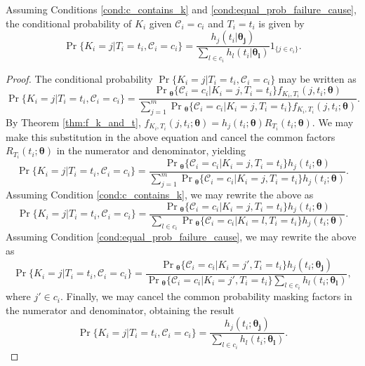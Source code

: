 \documentclass[
]{article}
\begin{document}
\begin{theorem}
Assuming Conditions \ref{cond:c_contains_k} and \ref{cond:equal_prob_failure_cause},
the conditional probability of $K_i$ given $\mathcal{C}_i = c_i$ and $T_i = t_i$
is given by
\begin{equation}
\label{eq:cond_prob_k_given_t_and_c}
\Pr\{K_i = j|T_i=t_i,\mathcal{C}_i=c_i\} =
 \frac{h_j(t_i|\boldsymbol{\theta_j})}{\sum_{l \in c_i} h_l(t_i|\boldsymbol{\theta_l})} 1_{\{j \in c_i\}}.
\end{equation}
\end{theorem}
\begin{proof}
The conditional probability $\Pr\{K_i = j|T_i=t_i,\mathcal{C}_i=c_i\}$ may be
written as
$$
\Pr\{K_i = j|T_i=t_i,\mathcal{C}_i=c_i\} =
    \frac{\Pr{}_{\!\boldsymbol{\theta}}\{\mathcal{C}_i=c_i|K_i = j,T_i=t_i\} f_{K_i,T_i}(j,t_i;\boldsymbol{\theta})}
    {\sum_{j=1}^m \Pr{}_{\!\boldsymbol{\theta}}
        \{\mathcal{C}_i=c_i|K_i = j,T_i=t_i\} f_{K_i,T_i}(j,t_i;\boldsymbol{\theta})}.
$$
By Theorem \ref{thm:f_k_and_t},
$f_{K_i,T_i}(j,t_i;\boldsymbol{\theta}) = h_j(t_i;\boldsymbol{\theta})R_{T_i}(t_i;\boldsymbol{\theta})$.
We may make this substitution in the above equation and cancel the common
factors $R_{T_i}(t_i;\boldsymbol{\theta})$ in the numerator and denominator, yielding
$$
\Pr\{K_i = j|T_i=t_i,\mathcal{C}_i=c_i\} =
    \frac{\Pr{}_{\!\boldsymbol{\theta}}\{\mathcal{C}_i=c_i|K_i = j,T_i=t_i\} h_j(t_i;\boldsymbol{\theta})}
         {\sum_{j=1}^m \Pr{}_{\!\boldsymbol{\theta}}\{\mathcal{C}_i=c_i|K_i=j,T_i=t_i\} h_j(t_i;\boldsymbol{\theta})}.
$$
Assuming Condition \ref{cond:c_contains_k}, we may rewrite the above as
$$
\Pr\{K_i = j|T_i=t_i,\mathcal{C}_i=c_i\}
    = \frac{\Pr{}_{\!\boldsymbol{\theta}}\{\mathcal{C}_i=c_i|K_i = j,T_i=t_i\} h_j(t_i;\boldsymbol{\theta})}
        {\sum_{l \in c_i} \Pr{}_{\!\boldsymbol{\theta}}\{\mathcal{C}_i=c_i|K_i = l,T_i=t_i\} h_j(t_i;\boldsymbol{\theta})}.
$$
Assuming Condition \ref{cond:equal_prob_failure_cause}, we may rewrite the above
as
$$
\Pr\{K_i = j|T_i=t_i,\mathcal{C}_i=c_i\} =
    \frac{\Pr{}_{\!\boldsymbol{\theta}}\{\mathcal{C}_i=c_i|K_i = j',T_i=t_i\} h_j(t_i;\boldsymbol{\theta_j})}
    {\Pr{}_{\!\boldsymbol{\theta}}\{\mathcal{C}_i=c_i|K_i = j',T_i=t_i\} {\sum_{l \in c_i} h_l(t_i;\boldsymbol{\theta_l})}},
$$
where $j' \in c_i$.
Finally, we may cancel the common probability masking factors in the numerator
and denominator, obtaining the result
$$
\Pr\{K_i = j|T_i=t_i,\mathcal{C}_i=c_i\} =
    \frac{h_j(t_i;\boldsymbol{\theta_j})}
    {\sum_{l \in c_i} h_l(t_i;\boldsymbol{\theta_l})}.
$$
\end{proof}
\end{document}
